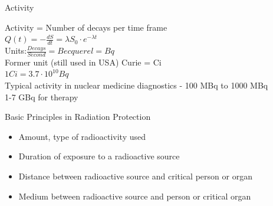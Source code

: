 \begin{frame}{Activity}
    \begin{center}
        Activity = Number of decays per time frame\\
        \bigskip
        {\LARGE
            $Q(t)=-\frac{dS}{dt}=\lambda S_0 \cdot e^{-\lambda t}$\\%
        }
        \bigskip
        Units:$ \frac{Decays}{Second} = Becquerel = Bq$\\
        \bigskip
        Former unit (still used in USA) Curie = Ci\\
        $1 Ci = 3.7 \cdot 10^{10}Bq$\\
        \bigskip
        Typical activity in nuclear medicine diagnostics - 100 MBq to 1000 MBq \\
        1-7 GBq for therapy
    \end{center}
\end{frame}

\begin{frame}[c]{Basic Principles in Radiation Protection}

    \begin{center}
        \begin{itemize}
            \setlength\itemsep{0.4cm}
            \item \textbf{\large \color{faublue}{Activity}}

                  Amount, type of radioactivity used

            \item \textbf{\large \color{faublue}{Time}}

                  Duration of exposure to a radioactive source

            \item \textbf{\large \color{faublue}{Distance}}

                  Distance between radioactive source and critical person or organ
            \item \textbf{\large \color{faublue}{Shielding}}

                  Medium between radioactive source and person or critical organ
        \end{itemize}
    \end{center}

\end{frame}


